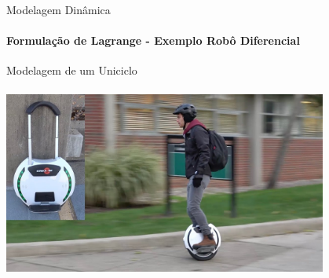 \documentclass{beamer}
\begin{document}
\begin{frame}{Modelagem Dinâmica}
    \framesubtitle{Formulação de Lagrange - Exemplo Robô Diferencial}
\end{frame}

\begin{frame}[c]{Modelagem de um Uniciclo}
    \framesubtitle{}
    \centering
    \includegraphics[width=0.8\textwidth]{./images/unicycle.jpg}
\end{frame}
\end{document}
